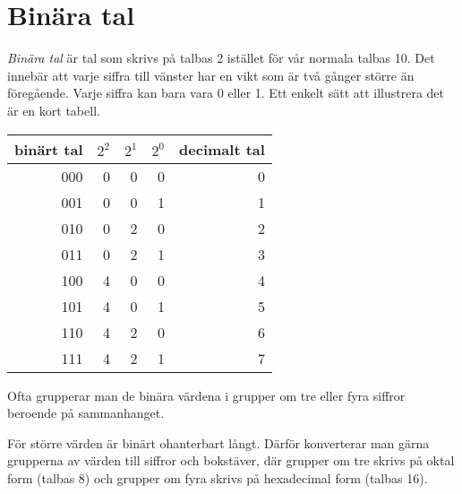 \section{Binära tal}

\emph{Binära tal} är tal som skrivs på talbas 2 istället för vår normala
talbas 10.
Det innebär att varje siffra till vänster har en vikt som är två gånger större
än föregående.
Varje siffra kan bara vara 0 eller 1.
Ett enkelt sätt att illustrera det är en kort tabell.

\begin{center}
\begin{tabular}{r|rrr|r}
  binärt tal & \(2^2\) & \(2^1\) & \(2^0\) & decimalt tal \\ \hline
  000 & 0 & 0 & 0 & 0 \\
  001 & 0 & 0 & 1 & 1 \\
  010 & 0 & 2 & 0 & 2 \\
  011 & 0 & 2 & 1 & 3 \\
  100 & 4 & 0 & 0 & 4 \\
  101 & 4 & 0 & 1 & 5 \\
  110 & 4 & 2 & 0 & 6 \\
  111 & 4 & 2 & 1 & 7 \\
\end{tabular}
\end{center}

Ofta grupperar man de binära värdena i grupper om tre eller fyra siffror
beroende på sammanhanget.

För större värden är binärt ohanterbart långt.
Därför konverterar man gärna grupperna av värden till siffror och bokstäver, där
grupper om tre skrivs på oktal form (talbas 8) och grupper om fyra skrivs på
hexadecimal form (talbas 16).

